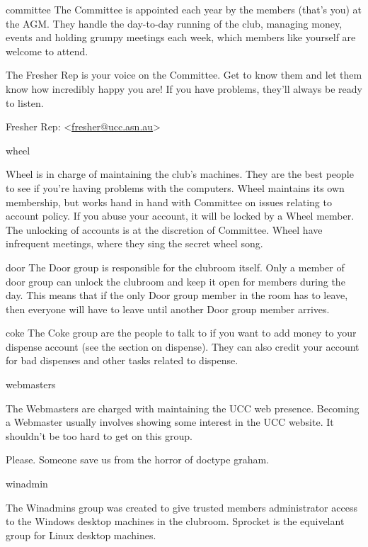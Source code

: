 \begin{uccgroup}{committee}
The Committee is appointed each year by the members (that's you) at the AGM. They handle the day-to-day running of the club, managing money, events and holding grumpy meetings each week, which members like yourself are welcome to attend.


The Fresher Rep is your voice on the Committee. Get to know them and let them know how incredibly happy you are! If you have problems, they'll always be ready to listen.

Fresher Rep: <\href{mailto:fresher@ucc.asn.au}{fresher@ucc.asn.au}>
\end{uccgroup}
\pagebreak
\begin{uccgroup}{wheel}

Wheel is in charge of maintaining the club's machines. They are the best people to see if you're having problems with the computers. Wheel maintains its own membership, but works hand in hand with Committee on issues relating to account policy. If you abuse your account, it will be locked by a Wheel member. The unlocking of accounts is at the discretion of Committee. Wheel have infrequent meetings, where they sing the secret wheel song. %

\end{uccgroup}

\begin{uccgroup}{door}
The Door group is responsible for the clubroom itself. Only a member of door group can unlock the clubroom and keep it open for members during the day. This means that if the only Door group member in the room has to leave, then everyone will have to leave until another Door group member arrives.
\end{uccgroup}
\pagebreak
\begin{uccgroup}{coke}
The Coke group are the people to talk to if you want to add money to your dispense account (see the section on dispense). They can also credit your account for bad dispenses and other tasks related to dispense.
\end{uccgroup}

\begin{uccgroup}{webmasters}

The Webmasters are charged with maintaining the UCC web presence. Becoming a Webmaster usually involves showing some interest in the UCC website. It shouldn't be too hard to get on this group.

 Please. Someone save us from the horror of doctype graham.
\end{uccgroup}

\begin{uccgroup}{winadmin}

The Winadmins group was created to give trusted members administrator access to the Windows desktop machines in the clubroom. Sprocket is the equivelant group for Linux desktop machines.
\end{uccgroup}






